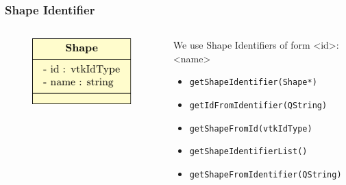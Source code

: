 \documentclass[compress]{beamer}
\begin{document}
\begin{frame}
\frametitle{Shape Identifier}

\begin{columns}
\begin{column}{.3\linewidth}
\begin{figure}[h]
\centering
\includegraphics[width=\textwidth]{diagramshape.pdf}
\end{figure}
\end{column}
\begin{column}{.7\linewidth}

We use Shape Identifiers of form <id>:<name>

\begin{itemize}
\item<2> \texttt{getShapeIdentifier(Shape*)}
\item<2> \texttt{getIdFromIdentifier(QString)}
\item<2> \texttt{getShapeFromId(vtkIdType)}
\item<2> \texttt{getShapeIdentifierList()}
\item<2> \texttt{getShapeFromIdentifier(QString)}
\end{itemize}

\end{column}
\end{columns}

\end{frame}
\end{document}
